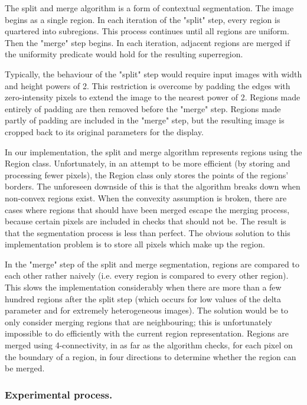 The split and merge algorithm is a form of contextual segmentation. The image begins as a single region. In each iteration of the "split" step, every region is quartered into subregions. This process continues until all regions are uniform. Then the "merge" step begins. In each iteration, adjacent regions are merged if the uniformity predicate would hold for the resulting superregion.

Typically, the behaviour of the "split" step would require input images with width and height powers of 2. This restriction is overcome by padding the edges with zero-intensity pixels to extend the image to the nearest power of 2. Regions made entirely of padding are then removed before the "merge" step. Regions made partly of padding are included in the "merge" step, but the resulting image is cropped back to its original parameters for the display.

In our implementation, the split and merge algorithm represents regions using the Region class. Unfortunately, in an attempt to be more efficient (by storing and processing fewer pixels), the Region class only stores the points of the regions' borders. The unforeseen downside of this is that the algorithm breaks down when non-convex regions exist. When the convexity assumption is broken, there are cases where regions that should have been merged escape the merging process, because certain pixels are included in checks that should not be. The result is that the segmentation process is less than perfect. The obvious solution to this implementation problem is to store all pixels which make up the region.

In the "merge" step of the split and merge segmentation, regions are compared to each other rather naively (i.e. every region is compared to every other region). This slows the implementation considerably when there are more than a few hundred regions after the split step (which occurs for low values of the delta parameter and for extremely heterogeneous images). The solution would be to only consider merging regions that are neighbouring; this is unfortunately impossible to do efficiently with the current region representation. Regions are merged using 4-connectivity, in as far as the algorithm checks, for each pixel on the boundary of a region, in four directions to determine whether the region can be merged.

\subsubsection{Experimental process.}

